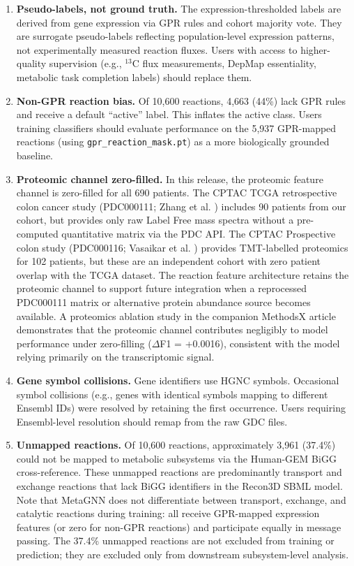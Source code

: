 \documentclass[12pt,a4paper]{article}
\begin{document}
\begin{enumerate}
\item \textbf{Pseudo-labels, not ground truth.} The expression-thresholded labels are derived from gene expression via GPR rules and cohort majority vote. They are surrogate pseudo-labels reflecting population-level expression patterns, not experimentally measured reaction fluxes. Users with access to higher-quality supervision (e.g., $^{13}$C flux measurements, DepMap essentiality, metabolic task completion labels) should replace them.

\item \textbf{Non-GPR reaction bias.} Of 10,600 reactions, 4,663 (44\%) lack GPR rules and receive a default ``active'' label. This inflates the active class. Users training classifiers should evaluate performance on the 5,937 GPR-mapped reactions (using \texttt{gpr\_reaction\_mask.pt}) as a more biologically grounded baseline.

\item \textbf{Proteomic channel zero-filled.} In this release, the proteomic feature channel is zero-filled for all 690 patients. The CPTAC TCGA retrospective colon cancer study (PDC000111; Zhang et al. \cite{Zhang2014}) includes 90 patients from our cohort, but provides only raw Label Free mass spectra without a pre-computed quantitative matrix via the PDC API. The CPTAC Prospective colon study (PDC000116; Vasaikar et al. \cite{Vasaikar2019}) provides TMT-labelled proteomics for 102 patients, but these are an independent cohort with zero patient overlap with the TCGA dataset. The reaction feature architecture retains the proteomic channel to support future integration when a reprocessed PDC000111 matrix or alternative protein abundance source becomes available. A proteomics ablation study in the companion MethodsX article \cite{Phongwattana2026} demonstrates that the proteomic channel contributes negligibly to model performance under zero-filling ($\Delta$F1 = +0.0016), consistent with the model relying primarily on the transcriptomic signal.

\item \textbf{Gene symbol collisions.} Gene identifiers use HGNC symbols. Occasional symbol collisions (e.g., genes with identical symbols mapping to different Ensembl IDs) were resolved by retaining the first occurrence. Users requiring Ensembl-level resolution should remap from the raw GDC files.

\item \textbf{Unmapped reactions.} Of 10,600 reactions, approximately 3,961 (37.4\%) could not be mapped to metabolic subsystems via the Human-GEM BiGG cross-reference. These unmapped reactions are predominantly transport and exchange reactions that lack BiGG identifiers in the Recon3D SBML model. Note that MetaGNN does not differentiate between transport, exchange, and catalytic reactions during training: all receive GPR-mapped expression features (or zero for non-GPR reactions) and participate equally in message passing. The 37.4\% unmapped reactions are not excluded from training or prediction; they are excluded only from downstream subsystem-level analysis.


\end{enumerate}
\end{document}
